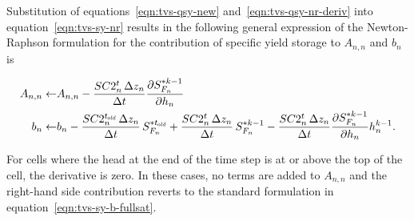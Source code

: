 \noindent Substitution of equations~\ref{eqn:tvs-qsy-new} and~\ref{eqn:tvs-qsy-nr-deriv} into equation~\ref{eqn:tvs-sy-nr} results in the following general expression of the Newton-Raphson formulation for the contribution of specific yield storage to $A_{n,n}$ and $b_n$ is

\begin{equation}
	\label{eqn:tvs-sy-Ab-std}
	\begin{aligned}
		A_{n,n} \leftarrow & A_{n,n} - \frac{SC2_n^t \, \Delta z_n}{\Delta t} \frac{\partial S_{F_n}^{\ast k-1}}{\partial h_n} \\
		b_n \leftarrow & b_n - \frac{SC2_n^{t_\mathit{\kern -0.07em old}} \, \Delta z_n}{\Delta t} \, S_{F_n}^{\ast t_\mathit{\kern -0.07em old}} + \frac{SC2_n^t \, \Delta z_n}{\Delta t} \, S_{F_n}^{\ast k-1} - \frac{SC2_n^t \, \Delta z_n}{\Delta t} \frac{\partial S_{F_n}^{\ast k-1}}{\partial h_n} h_n^{k-1} .
	\end{aligned}
\end{equation}

\noindent For cells where the head at the end of the time step is at or above the top of the cell, the derivative is zero. In these cases, no terms are added to $A_{n,n}$ and the right-hand side contribution reverts to the standard formulation in equation~\ref{eqn:tvs-sy-b-fullsat}.
